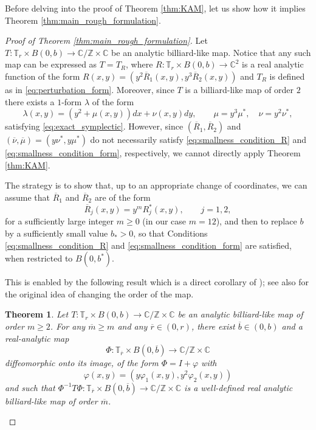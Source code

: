 \documentclass[10pt]{article}
\newtheorem{theorem}{Theorem}[section]
\newcommand{\Z}{\mathbb{Z}}
\newcommand{\C}{\mathbb{C}}
\newcommand{\T}{\mathbb{T}}
\begin{document}
Before delving into the proof of Theorem \ref{thm:KAM}, let us show how it implies Theorem \ref{thm:main_rough_formulation}.

\begin{proof}[Proof of Theorem \ref{thm:main_rough_formulation}]
Let $T: \T_r \times B(0, b) \to \C/\Z \times \C$ be an analytic billiard-like map. Notice that any such map can be expressed as $T = T_R$, where $R  : \T_r \times B(0, b) \to \C^2$ is a real analytic function of the form $R(x, y) = (y^2 \overline R_1(x, y), y^3 \overline R_2(x, y))$ and $T_R$ is defined as in \eqref{eq:perturbation_form}. Moreover, since $T$ is a billiard-like map of order $2$ there exists a $1$-form $\lambda$ of the form 
\[ \lambda(x, y) = (y^2 + \mu(x, y))dx + \nu(x, y)dy, \qquad \mu =y^3 \mu^*, \quad \nu = y^2 \nu^*,\]
satisfying \eqref{eq:exact_symplectic}. However, since $(\overline R_1, \overline R_2)$ and $(\overline \nu, \overline \mu) = (y\nu^*, y \mu^*)$ do not necessarily satisfy \eqref{eq:smallness_condition_R} and \eqref{eq:smallness_condition_form}, respectively, we cannot directly apply Theorem \ref{thm:KAM}.

The strategy is to show that, up to an appropriate change of coordinates, we can assume that $\overline R_1$ and $\overline R_2$ are of the form
\[
\overline R_j(x,y) = y^m R_j^\ast(x,y), \qquad j=1,2,
\]
 for a sufficiently large integer $m\geq 0$ (in our case $m=12$), and then to replace $b$ by a sufficiently small value $b_{\ast}>0$, so that Conditions \eqref{eq:smallness_condition_R} and \eqref{eq:smallness_condition_form} are satisfied, when restricted to $B(0, b^\ast)$.

This is enabled by the following result which is a direct corollary of \cite[Theorem 3]{MartinRamirezTamarit}); see also \cite{Lazutkin_book} for the original idea of changing the order of the map. 
\begin{theorem}
    \label{thm:RMS}
    Let $T:\T_r\times B(0,b)\to\C/\Z \times \C$ be an analytic billiard-like map of order $m\geq 2$. For any $\overline m \geq m$ and any $\overline r \in (0,r)$, there exist $\overline b \in(0,b)$ and a real-analytic map 
    \[
    \Phi: \T_{\overline r}\times B(0, \overline b)\to \C/\Z\times \C
    \]
    diffeomorphic onto its image, of the form $\Phi = I+\varphi$
    with 
    \[
    \varphi(x,y) = (y\varphi_1(x,y),y^2\varphi_2(x,y))
    \]
    and such that
    $\Phi^{-1}T\Phi : \T_{\overline r}\times B(0, \overline b)\to \C/\Z\times\C$
    is a well-defined real analytic billiard-like map of order $\overline m$. 
\end{theorem}


\end{proof}
\end{document}
